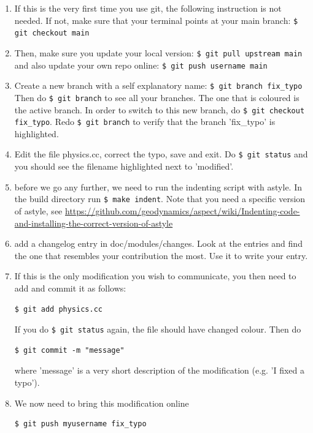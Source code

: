 \begin{enumerate}
\item
If this is the very first time you use git, the following instruction is not needed. If not, 
make sure that your terminal points at your main branch:
\verb"$ git checkout main"

\item
Then, make sure you update your local version:
\verb"$ git pull upstream main" 
and also update your own repo online:
\verb"$ git push username main"

\item
Create a new branch with a self explanatory name:
\verb"$ git branch fix_typo"
Then do \verb"$ git branch" to see all your branches. The one that is coloured is 
the active branch. In order to switch to this new branch, do 
\verb"$ git checkout fix_typo". Redo \verb"$ git branch" to verify that 
the branch 'fix\_typo' is highlighted.

\item
Edit the file physics.cc, correct the typo, save and exit. 
Do \verb"$ git status" and you should see the filename highlighted next to 'modified'. 

\item before we go any further, we need to run the indenting script with astyle. 
In the build directory run \verb'$ make indent'.
Note that you need a specific version of astyle, see \url{https://github.com/geodynamics/aspect/wiki/Indenting-code-and-installing-the-correct-version-of-astyle} 

\item add a changelog entry in doc/modules/changes. Look at the entries and find the one that resembles your contribution the most. Use it to 
write your entry.

\item If this is the only modification you wish to communicate, you then need to add and commit 
it as follows:
\begin{verbatim}
$ git add physics.cc
\end{verbatim}
If you do \verb'$ git status' again, the file should have changed colour. 
Then do
\begin{verbatim}
$ git commit -m "message"
\end{verbatim}
where 'message' is a very short description of the modification (e.g. 'I fixed a typo').

\item We now need to bring this modification online 
\begin{verbatim}
$ git push myusername fix_typo
\end{verbatim}


\end{enumerate}
